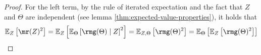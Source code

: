 \documentclass[
    a4paper, %
	fontsize=10pt, %
	twoside=false, %
]{kaobook}
\begin{document}
\begin{titlepage}
\begin{proof}
For the left term, by the rule of iterated expectation and the fact that $Z$ and $\Theta$ are independent (see lemma \ref{thm:expected-value-properties}), it holds that
$$
\mathbb{E}_{Z}\left[ \mr(Z) ^2 \right]  = \mathbb{E}_{Z}\left[ \mathbb{E}_{\Theta}\left[ \rmg(\Theta) \mid Z \right] ^2  \right] = \mathbb{E}_{Z, \Theta}\left[ \rmg(\Theta)^2 \right] %
= \mathbb{E}_{\Theta}\left[ \mathbb{E}_{Z}\left[ \rmg(\Theta) ^2 \right]  \right] 
$$


\end{proof}
\end{titlepage}
\end{document}
